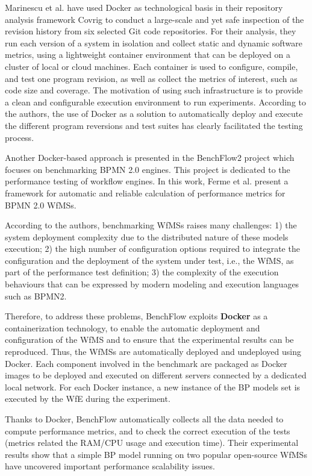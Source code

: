 Marinescu et al.\cite{marinescu2014covrig} have used Docker as technological basis in their repository analysis framework Covrig to conduct a large-scale and yet safe inspection of the revision history from six selected Git code repositories. 
For their analysis, they run each version of a system in isolation and collect static and dynamic software metrics, using a lightweight container environment that can be deployed on a cluster of local or cloud machines. Each container is used to configure, compile, and test one program revision, as well as collect the metrics of interest, such as code size and coverage.
The motivation of using such infrastructure is to provide a clean and configurable execution environment to run experiments. According to the authors, the use of Docker as a solution to automatically deploy and execute the different program reversions and test suites has clearly facilitated the testing process.


Another Docker-based approach is presented in the BenchFlow2 project which focuses on benchmarking BPMN 2.0 engines\cite{ferme2015framework}. This project is dedicated to the performance testing of workflow engines. In this work, Ferme et al. present a framework for automatic and reliable calculation of performance metrics for BPMN 2.0 WfMSs. 

According to the authors, benchmarking WfMSs raises many challenges: 1) the system deployment complexity due to the distributed nature of these models execution; 2) the high number of configuration options required to integrate the configuration and the deployment of the system under test, i.e., the WfMS, as part of the performance test definition; 3) the complexity of the execution behaviours that can be expressed by modern modeling and execution languages such as BPMN2.

Therefore, to address these problems, BenchFlow exploits \textbf{Docker} as a containerization technology, to enable the automatic deployment and configuration of the WfMS and to ensure that the experimental results can be reproduced.
Thus, the WfMSs are automatically deployed and undeployed using Docker. Each component involved in the benchmark are packaged as Docker images
to be deployed and executed on different servers connected by a dedicated local
network. For each Docker instance, a new instance of the BP models set is executed by the WfE during the experiment.

Thanks to Docker, BenchFlow automatically collects all the data needed to compute performance metrics, and to check the correct execution of the tests (metrics related the RAM/CPU usage and execution time).
Their experimental results show that a simple BP model running on two popular
open-source WfMSs have uncovered important performance scalability issues. 

